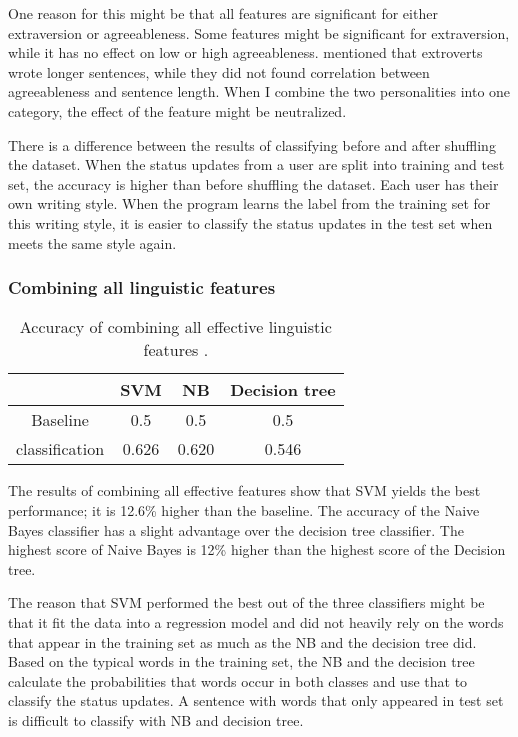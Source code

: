 \documentclass[
10pt, %
a4paper, %
oneside, %
headinclude,footinclude, %
] {book}%
\begin{document}
One reason for this might be that all features are significant for either extraversion or agreeableness. Some features might be significant for extraversion, while it has no effect on low or high agreeableness.\citet{gill2002taking} mentioned that extroverts wrote longer sentences, while they did not found correlation between agreeableness and sentence length.  When I combine the two personalities into one category, the effect of the feature might be neutralized.

There is a difference between the results of classifying before and after shuffling the dataset. When the status updates from a user are split into training and test set, the accuracy is higher than before shuffling the dataset. Each user has their own writing style. When the program learns the label from the training set for this writing style, it is easier to classify the status updates in the test set when meets the same style again.


\subsubsection{Combining all linguistic features}

\begin{table}[hbtp]\centering
\caption{Accuracy of combining all effective linguistic features .\label{table:allin}}
\begin{tabular}{|cccc|}
\hline
 & SVM & NB & Decision tree\\
\hline
Baseline &0.5 & 0.5 & 0.5\\
classification & 0.626 & 0.620 & 0.546\\
\hline
\end{tabular}
\end{table}

The results of combining all effective features show that SVM yields the best performance; it is 12.6\% higher than the baseline. The accuracy of the Naive Bayes classifier has a slight advantage over the decision tree classifier. The highest score of Naive Bayes is 12\% higher than the highest score of the Decision tree. 

The reason that SVM performed the best out of the three classifiers might be that it fit the data into a regression model and did not heavily rely on the words that appear in the training set as much as the NB and the decision tree did. Based on the typical words in the training set, the NB and the decision tree calculate the probabilities that words occur in both classes and use that to classify the status updates. A sentence with words that only appeared in test set is difficult to classify with NB and decision tree.
\end{document}

